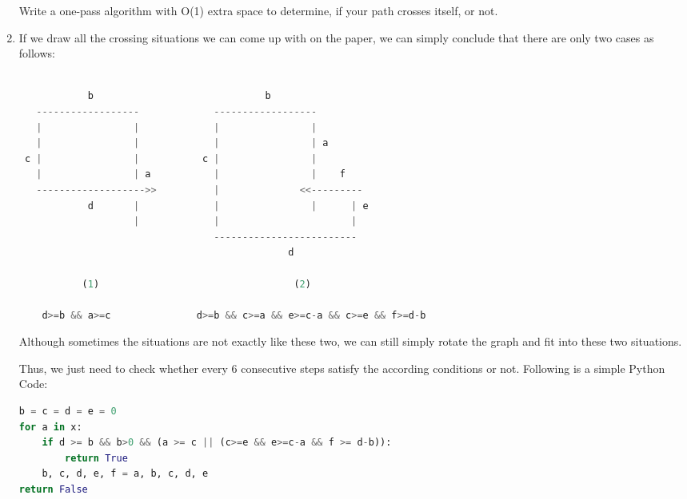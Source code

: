 \documentclass[12pt,a4paper]{article}
\makeatletter
\newtheorem*{solution}{Solution}
\renewenvironment{solution}[1][Solution] {\par\pushQED{\qed}\normalfont\topsep6\p@\@plus6\p@\relax\trivlist\item[\hskip\labelsep\bfseries#1\@addpunct{.}]\ignorespaces}{\popQED\endtrivlist\@endpefalse} \makeatother
\makeatother
\begin{document}
\begin{enumerate}
Write a one-pass algorithm with O(1) extra space to determine, if your path crosses itself, or not.


\begin{solution}

If we draw all the crossing situations we can come up with on the paper, we can simply conclude that there are only two cases as follows:

\begin{lstlisting}[language=Python] 

            b                              b
   ------------------             ------------------
   |                |             |                |
   |                |             |                | a
 c |                |           c |                |
   |                | a           |                |    f
   ------------------->>          |              <<---------
            d       |             |                |      | e
                    |             |                       |
                                  -------------------------
                                               d

           (1)                                  (2)

    d>=b && a>=c               d>=b && c>=a && e>=c-a && c>=e && f>=d-b 
\end{lstlisting}

Although sometimes the situations are not exactly like these two, we can still simply rotate the graph and fit into these two situations.

Thus, we just need to check whether every 6 consecutive steps satisfy the according conditions or not. Following is a simple Python Code:


\begin{lstlisting}[language=Python] 
b = c = d = e = 0
for a in x:
    if d >= b && b>0 && (a >= c || (c>=e && e>=c-a && f >= d-b)):
        return True
    b, c, d, e, f = a, b, c, d, e
return False

\end{lstlisting}

\end{solution}
~\\
~\\

\end{enumerate}
\end{document}
